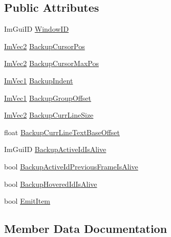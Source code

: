 \subsection*{Public Attributes}
\begin{DoxyCompactItemize}
\item 
Im\+Gui\+ID \hyperlink{structImGuiGroupData_acf765c14fa580e9ce791af7da68c5aa9}{Window\+ID}
\item 
\hyperlink{structImVec2}{Im\+Vec2} \hyperlink{structImGuiGroupData_a8b29e2d9081876fd4847b1cd86c60500}{Backup\+Cursor\+Pos}
\item 
\hyperlink{structImVec2}{Im\+Vec2} \hyperlink{structImGuiGroupData_abb83c4db050ef7d20485902cc14c4a0d}{Backup\+Cursor\+Max\+Pos}
\item 
\hyperlink{structImVec1}{Im\+Vec1} \hyperlink{structImGuiGroupData_a0eea82f9d3952d538431a23295e1beaa}{Backup\+Indent}
\item 
\hyperlink{structImVec1}{Im\+Vec1} \hyperlink{structImGuiGroupData_aebda25ad372538e8209c8fc3df9d64aa}{Backup\+Group\+Offset}
\item 
\hyperlink{structImVec2}{Im\+Vec2} \hyperlink{structImGuiGroupData_ae5220218236b037bce2e0775ab017f4a}{Backup\+Curr\+Line\+Size}
\item 
float \hyperlink{structImGuiGroupData_a1e6ccaa9ced52afc9763ede5d9c374b8}{Backup\+Curr\+Line\+Text\+Base\+Offset}
\item 
Im\+Gui\+ID \hyperlink{structImGuiGroupData_aacd18774380f912245f8be65f36889cc}{Backup\+Active\+Id\+Is\+Alive}
\item 
bool \hyperlink{structImGuiGroupData_afbb6878b27a6183b10af7b07fa16daa4}{Backup\+Active\+Id\+Previous\+Frame\+Is\+Alive}
\item 
bool \hyperlink{structImGuiGroupData_a641a75c7c4fab1ee5f24fa8dec85192b}{Backup\+Hovered\+Id\+Is\+Alive}
\item 
bool \hyperlink{structImGuiGroupData_ac7b2be78e0fb1f07e6c7bd564b8035d3}{Emit\+Item}
\end{DoxyCompactItemize}


\subsection{Member Data Documentation}
\mbox{\label{structImGuiGroupData_aacd18774380f912245f8be65f36889cc}} 
